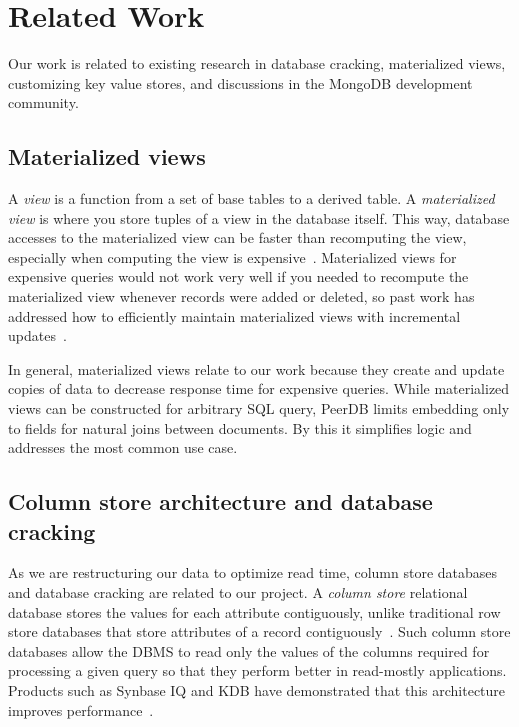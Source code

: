 \section{Related Work}

Our work is related to existing research in database cracking, materialized views, customizing key value stores, and discussions in the MongoDB development community.

\subsection{Materialized views}

A {\em view} is a function from a set of base tables to a derived table.
A {\em materialized view} is where you store tuples of a view in the database itself.
This way, database accesses to the materialized view can be faster than recomputing the view, especially when computing the view is expensive~\cite{Gupta1995}.
Materialized views for expensive queries would not work very well if you needed to recompute the materialized view whenever records were added or deleted, so past work has addressed how to efficiently maintain materialized views with incremental updates~\cite{Larson1985,Blakeley1986,Gupta1995,Zhou2007,Zhou2007a}.

In general, materialized views relate to our work because they create and update copies of data to decrease response time for expensive queries.
While materialized views can be constructed for arbitrary SQL query, PeerDB limits embedding only to fields for natural joins between documents.
By this it simplifies logic and addresses the most common use case.

\subsection{Column store architecture and database cracking}

As we are restructuring our data to optimize read time, column store databases and database cracking are related to our project.
A {\em column store} relational database stores the values for each attribute contiguously, unlike traditional row store databases that store attributes of a record contiguously~\cite{Stonebraker}.
Such column store databases allow the DBMS to read only the values of the columns required for processing a given query so that they perform better in read-mostly applications.
Products such as Synbase IQ and KDB have demonstrated that this architecture improves performance~\cite{Stonebraker,French1995}. 

